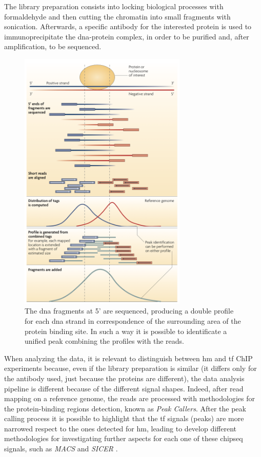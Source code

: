 The library preparation consists into locking biological processes with formaldehyde and then cutting the chromatin into small fragments with sonication.
Afterwards, a specific antibody for the interested protein is used to immunoprecipitate the \gls{dna}-protein complex, in order to be purified and, after amplification, to be sequenced.

\begin{figure}[H]
\centering
\includegraphics[width=8cm, keepaspectratio]{img/intro/peak_call.png}
\caption[\gls{chipseq} peak detection]{The \gls{dna} fragments at 5' are sequenced, producing a double profile for each \gls{dna} strand in correspondence of the surrounding area of the protein binding site.
In such a way it is possible to identificate a unified peak combining the profiles with the reads.\cite{Park2009}}
\label{fig:chipseqexp}
\end{figure}

When analyzing the data, it is relevant to distinguish between \gls{hm} and \gls{tf} ChIP experiments because, even if the library preparation is similar (it differs only for the antibody used, just because the proteins are different), the data analysis pipeline is different because of the different signal shapes.
Indeed, after read mapping on a reference genome, the reads are
processed with methodologies for the protein-binding regions detection, known as \textit{Peak Callers}.
After the peak calling process it is possible to highlight that the \gls{tf} signals (peaks) are more narrowed respect to the ones detected for \gls{hm}, leading to develop different methodologies for investigating further aspects for each one of these \gls{chipseq} signals, such as \textit{MACS} \cite{Zhang2008} and \textit{SICER} \cite{Zang2009}.


